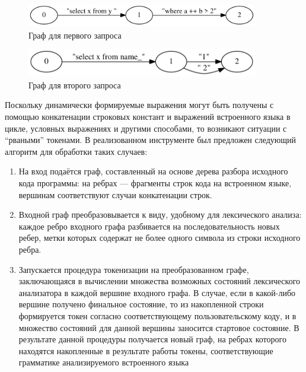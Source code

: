 \documentclass{matmex-diploma}
\begin{document}
\begin{enumerate}
\begin{figure}[h!]
\begin{center}
\includegraphics[width=0.9\textwidth]{Graph1}
\caption{Граф для первого запроса}
\label{fig:Graph1} 
\end{center}
\end{figure}

\begin{figure}[h!]
\begin{center}
\includegraphics[width=0.9\textwidth]{Graph2}
\caption{Граф для второго запроса}
\label{fig:Graph2} 
\end{center}
\end{figure}

Поскольку динамически формируемые выражения могут быть получены с помощью конкатенации строковых констант и выражений встроенного языка в цикле, 
условных выражениях и другими способами, то возникают ситуации с “рваными” токенами. В реализованном инструменте был предложен следующий алгоритм 
для обработки таких случаев:
\begin{enumerate}
\item	На вход подаётся граф, составленный на основе дерева разбора исходного кода программы: на ребрах — фрагменты строк кода на встроенном языке, 
вершинам соответствуют случаи конкатенации строк.
\item	Входной граф преобразовывается к виду, удобному для лексического анализа: каждое ребро входного графа разбивается на последовательность новых 
ребер, метки которых содержат не более одного символа из строки исходного ребра.
\item   Запускается процедура токенизации на преобразованном графе, заключающаяся в вычислении множества возможных состояний лексического анализатора
в каждой вершине входного графа. В случае, если в какой-либо вершине получено финальное состояние, то из накопленной строки формируется токен согласно 
соответствующему пользовательскому коду, и в множество состояний для данной вершины заносится стартовое состояние. В результате данной процедуры получается
новый граф, на ребрах которого находятся накопленные в результате работы токены, соответствующие грамматике анализируемого встроенного языка
\end{enumerate}


\end{enumerate}
\end{document}
